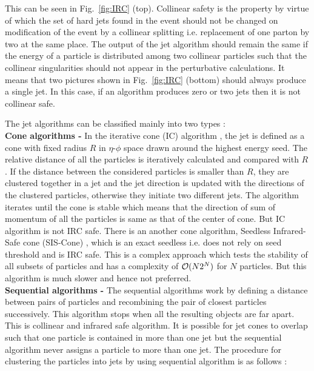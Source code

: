  This can be seen in Fig.~\ref{fig:IRC} (top). Collinear safety is the property by virtue of which the set of hard jets found in the event should not be changed on modification of the event by a collinear splitting i.e. replacement of one parton by two at the same place. The output of the jet algorithm should remain the same if the energy of a particle is distributed among two collinear particles such that the collinear singularities should not appear in the perturbative calculations. It means that two pictures shown in Fig.~\ref{fig:IRC} (bottom) should always produce a single jet. In this case, if an algorithm produces zero or two jets then it is not collinear safe. 

The jet algorithms can be classified mainly into two types : \\ \newline
{\bf Cone algorithms -} In the iterative cone (IC) algorithm \cite{Blazey:2000qt}, the jet is defined as a cone with fixed radius $R$ in $\eta$-$\phi$ space drawn around the highest energy seed. The relative distance of all the particles is iteratively calculated and compared with $R$. If the distance between the considered particles is smaller than $R$, they are clustered together in a jet and the jet direction is updated with the directions of the clustered particles, otherwise they initiate two different jets. The algorithm iterates until the cone is stable which means that the direction of sum of momentum of all the particles is same as that of the center of cone. But IC algorithm is not IRC safe. There is an another cone algorithm, Seedless Infrared-Safe cone (SIS-Cone) \cite{Weinzierl:2011jx}, which is an exact seedless i.e. does not rely on seed threshold and is IRC safe. This is a complex approach which tests the stability of all subsets of particles and has a complexity of ${\cal O}(N2^{N})$ for $N$ particles. But this algorithm is much slower and hence not preferred. \\ \newline
{\bf Sequential algorithms -} The sequential algorithms \cite{Ellis:1993tq} work by defining a distance between pairs of particles and recombining the pair of closest particles successively. This algorithm stops when all the resulting objects are far apart. This is collinear and infrared safe algorithm. It is possible for jet cones to overlap such that one particle is contained in more than one jet but the sequential algorithm never assigns a particle to more than one jet. The procedure for clustering the particles into jets by using sequential algorithm is as follows : 
